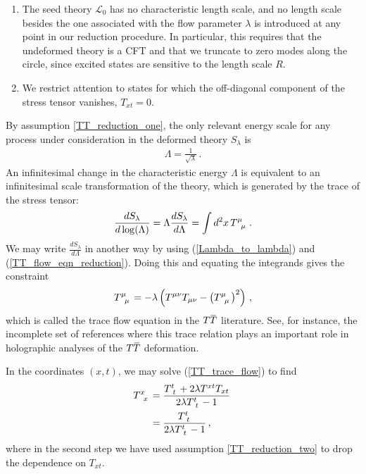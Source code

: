 \documentclass[12pt]{article}
\numberwithin{equation}{section}
\newcommand{\overbar}[1]{\mkern 1.5mu\overline{\mkern-1.5mu#1\mkern-1.5mu}\mkern 1.5mu}
\def\TT{{T\overbar{T}}}
\begin{document}
\begin{enumerate}[label=(\Roman*)]
    \item\label{TT_reduction_one} The seed theory $\mathcal{L}_0$ has no characteristic length scale, and no length scale besides the one associated with the flow parameter $\lambda$ is introduced at any point in our reduction procedure. In particular, this requires that the undeformed theory is a CFT and that we truncate to zero modes along the circle, since excited states are sensitive to the length scale $R$.

    \item\label{TT_reduction_two} We restrict attention to states for which the off-diagonal component of the stress tensor vanishes, $T_{xt} = 0$.
\end{enumerate}

By assumption \ref{TT_reduction_one}, the only relevant energy scale for any process under consideration in the deformed theory $S_\lambda$ is
%
\begin{align}\label{Lambda_to_lambda}
    \Lambda = \frac{1}{\sqrt{\lambda}} \, .
\end{align}
%
An infinitesimal change in the characteristic energy $\Lambda$ is equivalent to an infinitesimal scale transformation of the theory, which is generated by the trace of the stress tensor:
%
\begin{align}
    \frac{d S_\lambda}{d \log ( \Lambda )} = \Lambda \frac{d S_\lambda}{d \Lambda} = \int d^2 x \, \tensor{T}{^\mu_\mu} \, .
\end{align}
%
We may write $\frac{d S_\lambda}{d \Lambda}$ in another way by using (\ref{Lambda_to_lambda}) and (\ref{TT_flow_eqn_reduction}). Doing this and equating the integrands gives the constraint
%
\begin{align}\label{TT_trace_flow}
    \tensor{T}{^\mu_\mu} = - \lambda \left( T^{\mu \nu} T_{\mu \nu} - \left( \tensor{T}{^\mu_\mu} \right)^2 \right) \, ,
\end{align}
%
which is called the trace flow equation in the $\TT$ literature. See, for instance, the incomplete set of references \cite{McGough:2016lol,Kraus:2018xrn,Kraus:2021cwf,Ebert:2022cle,Kraus:2022mnu} where this trace relation plays an important role in holographic analyses of the $\TT$ deformation.

In the coordinates $(x,t)$, we may solve (\ref{TT_trace_flow}) to find
%
\begin{align}\label{Txx_solved}
    \tensor{T}{^x_x} &= \frac{\tensor{T}{^t_t} + 2 \lambda T^{xt} T_{xt} }{2 \lambda \tensor{T}{^t_t} - 1 } \, \nonumber \\
    &= \frac{\tensor{T}{^t_t}}{2 \lambda \tensor{T}{^t_t} - 1 } \, , 
\end{align}
%
where in the second step we have used assumption \ref{TT_reduction_two} to drop the dependence on $T_{xt}$.
\end{document}
